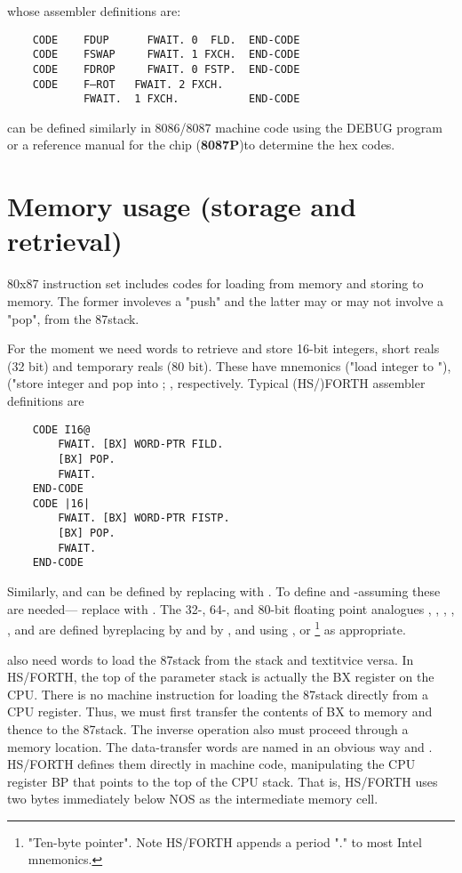 whose assembler definitions are:
\begin{lstlisting}
    CODE    FDUP      FWAIT. 0  FLD.  END-CODE
    CODE    FSWAP     FWAIT. 1 FXCH.  END-CODE
    CODE    FDROP     FWAIT. 0 FSTP.  END-CODE
    CODE    F—ROT   FWAIT. 2 FXCH.
            FWAIT.  1 FXCH.           END-CODE
\end{lstlisting}

can be defined similarly in 8086/8087 machine code using the
DEBUG program or a reference manual for the chip (\eg \textbf{8087P})to determine the hex codes.

\section{Memory usage (storage and retrieval)}

 80x87 instruction set includes codes for loading  from memory and storing  to memory. The former involeves a "push" and the latter may or may not involve a "pop", from
the 87stack.

For the moment we need words to retrieve and store 16-bit integers, short reals (32 bit) and temporary reals (80 bit). These have mnemonics  ("load integer to "), ("store integer and pop  into ; ,  respectively. Typical (HS/)FORTH assembler definitions are

\begin{lstlisting}
    CODE I16@
        FWAIT. [BX] WORD-PTR FILD.
        [BX] POP.
        FWAIT.
    END-CODE
    CODE |16|
        FWAIT. [BX] WORD-PTR FISTP.
        [BX] POP.
        FWAIT.
    END-CODE
\end{lstlisting}

Similarly,  and  can be defined by replacing  with . To define  and  -assuming these are needed— replace  with . The 32-, 64-, and 80-bit floating point analogues , , , , , and  are defined byreplacing  by  and  by , and using ,  or \footnote{"Ten-byte pointer". Note HS/FORTH appends a period "." to most Intel mnemonics.} as appropriate.

 also need words to load the 87stack from the stack and textit{vice versa}. In HS/FORTH, the top of the parameter stack is actually the BX register on the CPU. There is no machine instruction for loading the 87stack directly from a CPU register. Thus, we must first transfer the contents of BX to memory and thence to the 87stack. The inverse operation also must proceed through a memory location. The data-transfer words are named in an obvious way  and . HS/FORTH defines them directly in machine code, manipulating the CPU register BP that points to the top of the CPU stack. That is, HS/FORTH uses two bytes immediately below NOS as the intermediate memory cell.

